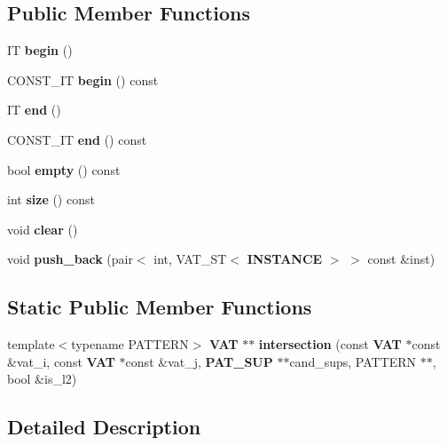 \subsection*{Public Member Functions}
\begin{CompactItemize}
\item 
IT {\bf begin} ()\label{classvat_3_01SEQ__PROP_00_01V__Fkk__IND__MINE__PROP_00_01VAT__ST_01_4_a0}

\item 
CONST\_\-IT {\bf begin} () const \label{classvat_3_01SEQ__PROP_00_01V__Fkk__IND__MINE__PROP_00_01VAT__ST_01_4_a1}

\item 
IT {\bf end} ()\label{classvat_3_01SEQ__PROP_00_01V__Fkk__IND__MINE__PROP_00_01VAT__ST_01_4_a2}

\item 
CONST\_\-IT {\bf end} () const \label{classvat_3_01SEQ__PROP_00_01V__Fkk__IND__MINE__PROP_00_01VAT__ST_01_4_a3}

\item 
bool {\bf empty} () const \label{classvat_3_01SEQ__PROP_00_01V__Fkk__IND__MINE__PROP_00_01VAT__ST_01_4_a4}

\item 
int {\bf size} () const \label{classvat_3_01SEQ__PROP_00_01V__Fkk__IND__MINE__PROP_00_01VAT__ST_01_4_a5}

\item 
void {\bf clear} ()\label{classvat_3_01SEQ__PROP_00_01V__Fkk__IND__MINE__PROP_00_01VAT__ST_01_4_a6}

\item 
void {\bf push\_\-back} (pair$<$ int, VAT\_\-ST$<$ {\bf INSTANCE} $>$ $>$ const \&inst)\label{classvat_3_01SEQ__PROP_00_01V__Fkk__IND__MINE__PROP_00_01VAT__ST_01_4_a7}

\end{CompactItemize}
\subsection*{Static Public Member Functions}
\begin{CompactItemize}
\item 
template$<$typename PATTERN$>$ {\bf VAT} $\ast$$\ast$ {\bf intersection} (const  {\bf VAT} $\ast$const \&vat\_\-i, const  {\bf VAT} $\ast$const \&vat\_\-j, {\bf PAT\_\-SUP} $\ast$$\ast$cand\_\-sups, PATTERN $\ast$$\ast$, bool \&is\_\-l2)
\end{CompactItemize}


\subsection{Detailed Description}

